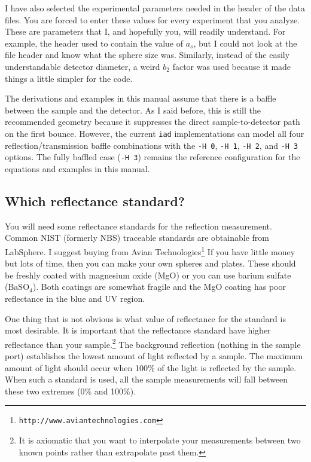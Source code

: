 \documentclass{article}
\newcommand\iadprog{\texttt{iad}}
\begin{document}
I have also selected the experimental parameters needed in the header of the 
data files.  You are forced to enter these values for every experiment that
you analyze.  These are parameters that I, and hopefully you, will readily
understand.  For example, the header
used to contain the value of $a_s$, but I could not look at the file header and
know what the sphere size was.  Similarly, instead of the easily understandable
detector diameter, a weird $b_2$ factor was used because it made things a little 
simpler for the code. 

The derivations and examples in this manual assume that there is a baffle
between the sample and the detector.  As I said before, this is still the
recommended geometry because it suppresses the direct sample-to-detector
path on the first bounce.  However, the current \iadprog{} implementations
can model all four reflection/transmission baffle combinations with the
\texttt{-H 0}, \texttt{-H 1}, \texttt{-H 2}, and \texttt{-H 3} options.
The fully baffled case (\texttt{-H 3}) remains the reference configuration
for the equations and examples in this manual.

\subsection{Which reflectance standard?}

You will need some reflectance standards for the reflection measurement.  Common NIST (formerly NBS)
traceable standards are obtainable from LabSphere.  I suggest buying from
Avian Technologies\footnote{
\texttt{http://www.aviantechnologies.com}}
If you have little money but lots of time, then you can make your
own spheres and plates.  These should be freshly coated with magnesium oxide
(MgO) or you can use barium sulfate (BaSO$_4$).  Both coatings are somewhat
fragile and the MgO coating has poor reflectance in the blue and UV region.

One thing that is not obvious is what value of reflectance for the standard
is most desirable.  It is important that the reflectance standard have higher
reflectance than your sample.\footnote{It is axiomatic that you want
to interpolate your measurements between two known points rather than
extrapolate past them.}  The background reflection (nothing in the sample port)
establishes the lowest amount of light reflected by a sample.  The maximum
amount of light should occur when 100\% of the light is reflected by the sample.
When such a standard is used, all the sample measurements
will fall between these two extremes (0\% and 100\%).  
\end{document}
